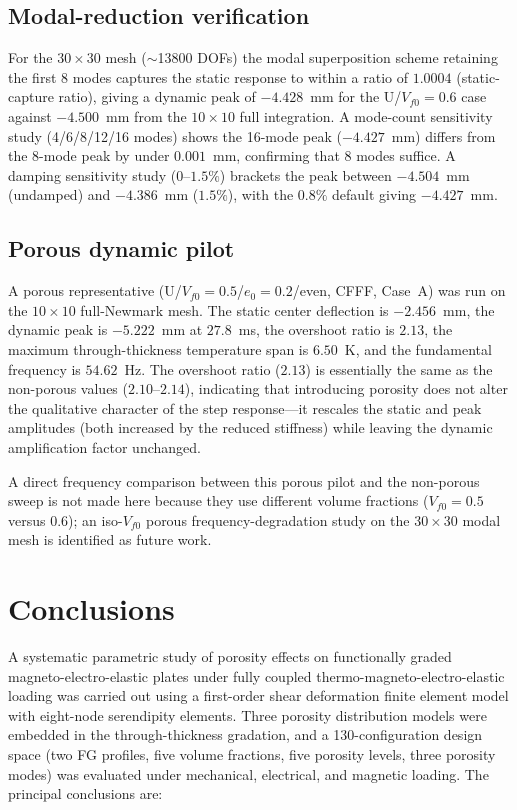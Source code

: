 \documentclass[11pt,a4paper]{article}
\begin{document}
\subsection{Modal-reduction verification}

For the $30\times30$ mesh ($\sim$13800 DOFs) the modal superposition scheme retaining the first 8 modes captures the static response to within a ratio of $1.0004$ (static-capture ratio), giving a dynamic peak of $-4.428$~mm for the U/$V_{f0}=0.6$ case against $-4.500$~mm from the $10\times10$ full integration. A mode-count sensitivity study (4/6/8/12/16 modes) shows the 16-mode peak ($-4.427$~mm) differs from the 8-mode peak by under $0.001$~mm, confirming that 8 modes suffice. A damping sensitivity study ($0$--$1.5\%$) brackets the peak between $-4.504$~mm (undamped) and $-4.386$~mm ($1.5\%$), with the $0.8\%$ default giving $-4.427$~mm.

\subsection{Porous dynamic pilot}

A porous representative (U/$V_{f0}=0.5$/$e_0=0.2$/even, CFFF, Case~A) was run on the $10\times10$ full-Newmark mesh. The static center deflection is $-2.456$~mm, the dynamic peak is $-5.222$~mm at $27.8$~ms, the overshoot ratio is $2.13$, the maximum through-thickness temperature span is $6.50$~K, and the fundamental frequency is $54.62$~Hz. The overshoot ratio ($2.13$) is essentially the same as the non-porous values ($2.10$--$2.14$), indicating that introducing porosity does not alter the qualitative character of the step response---it rescales the static and peak amplitudes (both increased by the reduced stiffness) while leaving the dynamic amplification factor unchanged.

A direct frequency comparison between this porous pilot and the non-porous sweep is not made here because they use different volume fractions ($V_{f0}=0.5$ versus $0.6$); an iso-$V_{f0}$ porous frequency-degradation study on the $30\times30$ modal mesh is identified as future work.

\section{Conclusions}

A systematic parametric study of porosity effects on functionally graded magneto-electro-elastic plates under fully coupled thermo-magneto-electro-elastic loading was carried out using a first-order shear deformation finite element model with eight-node serendipity elements. Three porosity distribution models were embedded in the through-thickness gradation, and a 130-configuration design space (two FG profiles, five volume fractions, five porosity levels, three porosity modes) was evaluated under mechanical, electrical, and magnetic loading. The principal conclusions are:
\end{document}
